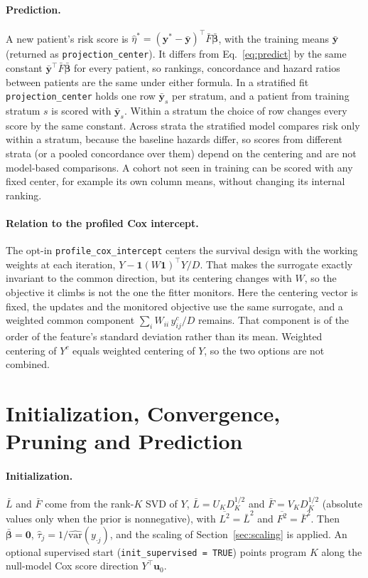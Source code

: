 \documentclass[11pt]{article}
\begin{document}
\paragraph{Prediction.} A new patient's risk score is
$\hat\eta^* = (\bm y^* - \bar{\bm y})^\top\bar F\bar{\bm\beta}$, with the training
means $\bar{\bm y}$ (returned as \texttt{projection\_center}). It differs from
Eq.~\eqref{eq:predict} by the same constant $\bar{\bm y}^\top\bar F\bar{\bm\beta}$
for every patient, so rankings, concordance and hazard ratios between patients
are the same under either formula. In a stratified fit \texttt{projection\_center}
holds one row $\bar{\bm y}_s$ per stratum, and a patient from training stratum $s$
is scored with $\bar{\bm y}_s$. Within a stratum the choice of row changes every
score by the same constant. Across strata the stratified model compares risk only
within a stratum, because the baseline hazards differ, so scores from different
strata (or a pooled concordance over them) depend on the centering and are not
model-based comparisons. A cohort not seen in training can be scored with any
fixed center, for example its own column means, without changing its internal
ranking.

\paragraph{Relation to the profiled Cox intercept.} The opt-in
\texttt{profile\_cox\_intercept} centers the survival design with the working
weights at each iteration, $Y - \bm 1(W\bm 1)^\top Y/D$. That makes the surrogate
exactly invariant to the common direction, but its centering changes with $W$,
so the objective it climbs is not the one the fitter monitors. Here the centering
vector is fixed, the updates and the monitored objective use the same surrogate,
and a weighted common component $\sum_i W_{ii}\,y^c_{ij}/D$ remains. That
component is of the order of the feature's standard deviation rather than its
mean. Weighted centering of $Y^c$ equals weighted centering of $Y$, so the two
options are not combined.

\section{Initialization, Convergence, Pruning and Prediction}\label{sec:other}

\paragraph{Initialization.} $\bar L$ and $\bar F$ come from the rank-$K$ SVD of $Y$,
$\bar L = U_K D_K^{1/2}$ and $\bar F = V_K D_K^{1/2}$ (absolute values only when the
prior is nonnegative), with $\overline{L^2} = \bar L^2$ and $\overline{F^2} = \bar F^2$.
Then $\bar{\bm\beta} = \bm 0$, $\hat\tau_j = 1/\widehat{\mathrm{var}}(y_{\cdot j})$, and
the scaling of Section~\ref{sec:scaling} is applied. An optional supervised start
(\texttt{init\_supervised = TRUE}) points program $K$ along the null-model Cox
score direction $Y^\top\bm u_0$.
\end{document}

